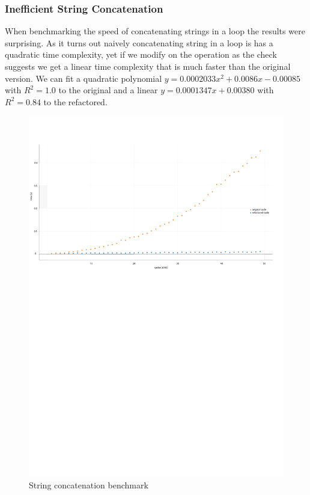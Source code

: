 \subsubsection{Inefficient String Concatenation}
\par When benchmarking the speed of concatenating strings in a loop the results were surprising. As it turns out naively concatenating string in a loop is has a quadratic time complexity, yet if we modify on the operation as the check suggests we get a linear time complexity that is much faster than the original version. We can fit a quadratic polynomial $y=0.0002033x^2+0.0086x-0.00085$ with $R^2=1.0$ to the original and a linear $y=0.0001347x+0.00380$ with $R^2=0.84$ to the refactored. 
\begin{figure}[H]
	\caption{String concatenation benchmark}
	\includegraphics[scale=0.7]{images/string_concat.pdf}
\end{figure}
